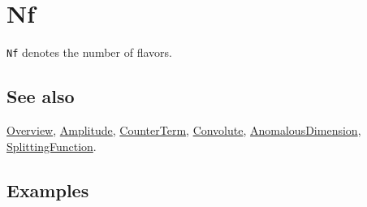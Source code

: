 \documentclass[../FeynCalcManual.tex]{subfiles}
\begin{document}
\hypertarget{nf}{%
\section{Nf}\label{nf}}

\texttt{Nf} denotes the number of flavors.

\subsection{See also}

\hyperlink{toc}{Overview}, \hyperlink{amplitude}{Amplitude},
\hyperlink{counterterm}{CounterTerm}, \hyperlink{convolute}{Convolute},
\hyperlink{anomalousdimension}{AnomalousDimension},
\hyperlink{splittingfunction}{SplittingFunction}.

\subsection{Examples}
\end{document}
